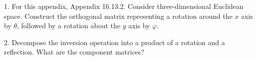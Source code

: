 \bigskip

\baselineskip=12pt


\bigskip


\item {1.} For this appendix, Appendix 16.13.2.  Consider three-dimensional 
Euclidean space.  Construct the orthogonal matrix representing a 
rotation around the $x$ axis by $\theta$, followed by a rotation about 
the $y$ axis by $\varphi$.

\item {2.} Decompose the inversion operation into a product of a 
rotation and a reflection.  What are the component matrices? 

\bigskip

